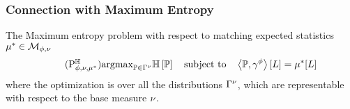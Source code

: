 




\subsubsection{Connection with Maximum Entropy}\label{sec:maxEntDuality}


The Maximum entropy problem with respect to matching expected statistics $\mu^*\in\mathcal{M}_{\phi,\nu}$ 
\begin{align}\tag{$\probtagtypeinst{\entropysymbol}{\sstat,\basemeasure,\genmean}$}\label{prob:maxEntropy}
	\argmax_{\probtensor\in\Gamma^{\basemeasure}} \sentropyof{\probtensor} \quad \text{subject to} \quad 
	 \sbcontractionof{\probtensor,\sencsstat}{\selvariable} =  \genmeanat{\selvariable}
\end{align}
where the optimization is over all the distributions $\Gamma^{\nu}$, which are representable with respect to the base measure $\nu$.

